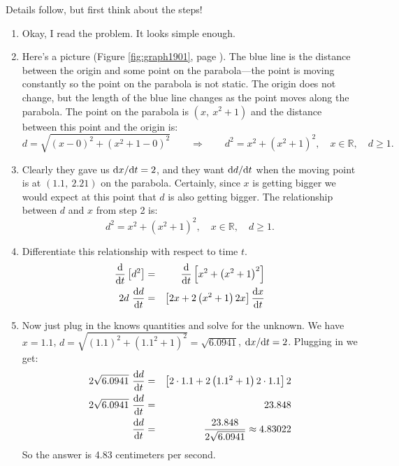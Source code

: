 \documentclass[12pt,addpoints, answers, fleqn]{exam}
\begin{document}
\begin{solution}
Details follow, but first think about the steps!
\begin{enumerate}
\item Okay, I read the problem. It looks simple enough.
\item Here's a picture (Figure \ref{fig:graph1901}, page \pageref{fig:graph1901}).  The blue line is the distance between the origin and some point on the parabola---the point is moving constantly so the point on the parabola is not static. The origin does not change, but the length of the blue line changes as the point moves along the parabola. The point on the parabola is $\left( x, \ x^2 + 1 \right)$ and the distance between this point and the origin is:
\[
d = \sqrt{\left( x - 0 \right)^2 + \left( x^2 + 1 - 0 \right)^2} \qquad \Rightarrow \qquad d^2 = x^2 + \left( x^2 + 1\right)^2, \quad x \in \mathbb{R}, \quad d \geq 1.
\]

\item Clearly they gave us ${\rm{d}}x/{{\rm{d}}t}=2$, and they want ${\rm{d}}d/{{\rm{d}}t}$ when the moving point is at $\left( 1.1, \ 2.21 \right)$ on the parabola. Certainly, since $x$ is getting bigger we would expect at this point that $d$ is also getting bigger. The relationship between $d$ and $x$ from step 2 is:
\[
d^2 = x^2 + \left( x^2 + 1\right)^2, \quad x \in \mathbb{R}, \quad d \geq 1.
\]
\item Differentiate this relationship with respect to time $t$.
\begin{eqnarray*}
\frac{{\rm{d}}}{{\rm{d}}t} \left[ d^2 \right] &=& \frac{{\rm{d}}}{{\rm{d}}t} \left[x^2 + \left( x^2 + 1\right)^2\right]\\
2d \ \frac{{\rm{d}}d}{{\rm{d}}t} &=&  \left[2x + 2\left( x^2 + 1\right)2x\right] \frac{{\rm{d}}x}{{\rm{d}}t}\\
\end{eqnarray*}

\item Now just plug in the knows quantities and solve for the unknown. We have $x = 1.1$, $d = \sqrt{\left( 1.1 \right)^2 + \left( 1.1^2 + 1\right)^2} = \sqrt{6.0941}$, ${\rm{d}}x/{{\rm{d}}t} = 2$. Plugging in we get:
\begin{eqnarray*}
2 \sqrt{6.0941} \ \frac{{\rm{d}}d}{{\rm{d}}t} &=&  \left[2\cdot1.1 + 2\left( 1.1^2 + 1\right)2\cdot1.1\right] 2\\
2 \sqrt{6.0941} \ \frac{{\rm{d}}d}{{\rm{d}}t} &=&  23.848\\
 \ \frac{{\rm{d}}d}{{\rm{d}}t} &=&  \frac{23.848}{2 \sqrt{6.0941}} \approx 4.83022
\end{eqnarray*}
So the answer is 4.83 centimeters per second.

\end{enumerate}
\end{solution}
\end{document}
